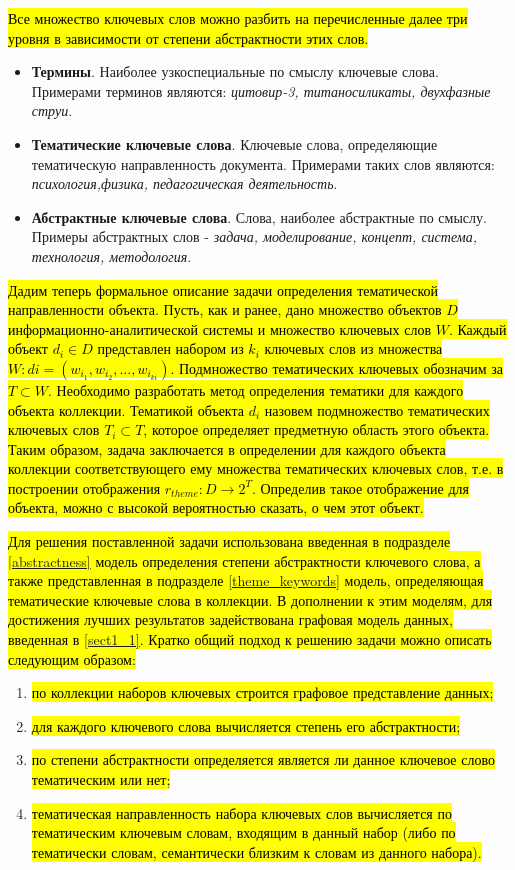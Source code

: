 \hl{Все множество ключевых слов можно разбить на перечисленные далее три уровня в зависимости от степени абстрактности этих слов.}
\begin{itemize}
    \item \textbf{Термины}. Наиболее узкоспециальные по смыслу ключевые слова. Примерами терминов являются: \emph{цитовир-3, титаносиликаты, двухфазные струи}.
    \item \textbf{Тематические ключевые слова}. Ключевые слова, определяющие тематическую направленность документа. Примерами таких слов являются: \emph{психология,физика, педагогическая деятельность}.
    \item \textbf{Абстрактные ключевые слова}. Слова, наиболее абстрактные по смыслу. Примеры абстрактных слов - \emph{задача, моделирование, концепт, система, технология, методология}.
\end{itemize}

\hl{Дадим теперь формальное описание задачи определения тематической направленности объекта. Пусть, как и ранее, дано множество объектов $D$ информационно-аналитической системы и множество ключевых слов $W$. Каждый объект $d_i \in D$ представлен набором из $k_i$ ключевых слов из множества $W: di = (w_{i_1},w_{i_2},...,w_{i_{ki}})$. Подмножество тематических ключевых обозначим за $T \subset W$. Необходимо разработать метод определения тематики для каждого объекта коллекции. Тематикой объекта $d_i$ назовем подмножество тематических ключевых слов $T_{i} \subset T$, которое определяет предметную область этого объекта. Таким образом, задача заключается в определении для каждого объекта коллекции соответствующего ему множества тематических ключевых слов, т.е. в построении отображения $r_{theme}: D \rightarrow 2^T$. Определив такое отображение для объекта, можно с высокой вероятностью сказать, о чем этот объект.}


\hl{Для решения поставленной задачи использована введенная в подразделе \ref{abstractness} модель определения степени абстрактности ключевого слова, а также представленная в подразделе \ref{theme_keywords} модель, определяющая тематические ключевые слова в коллекции. В дополнении к этим моделям, для достижения лучших результатов задействована графовая модель данных, введенная в \ref{sect1_1}. Кратко общий подход к решению задачи можно описать следующим образом:}

\begin{enumerate}
    \item \hl{по коллекции наборов ключевых строится графовое представление данных;}
    \item \hl{для каждого ключевого слова вычисляется степень его абстрактности;}
    \item \hl{по степени абстрактности определяется является ли данное ключевое слово тематическим или нет;}
    \item \hl{тематическая направленность набора ключевых слов вычисляется по тематическим ключевым словам, входящим в данный набор (либо по тематически словам, семантически близким  к словам из данного набора).}
\end{enumerate}

